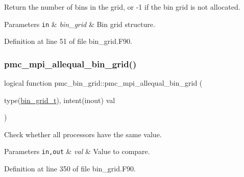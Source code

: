 Return the number of bins in the grid, or -\/1 if the bin grid is not allocated. 


\begin{DoxyParams}[1]{Parameters}
\mbox{\tt in}  & {\em bin\+\_\+grid} & Bin grid structure. \\
\hline
\end{DoxyParams}


Definition at line 51 of file bin\+\_\+grid.\+F90.

\mbox{\label{namespacepmc__bin__grid_a7a3956cc26b9ca8736fb65b47a1f8b67}} 
\subsubsection{\texorpdfstring{pmc\+\_\+mpi\+\_\+allequal\+\_\+bin\+\_\+grid()}{pmc\_mpi\_allequal\_bin\_grid()}}
{\footnotesize\ttfamily logical function pmc\+\_\+bin\+\_\+grid\+::pmc\+\_\+mpi\+\_\+allequal\+\_\+bin\+\_\+grid (\begin{DoxyParamCaption}\item[{type(\mbox{\hyperlink{structpmc__bin__grid_1_1bin__grid__t}{bin\+\_\+grid\+\_\+t}}), intent(inout)}]{val }\end{DoxyParamCaption})}



Check whether all processors have the same value. 


\begin{DoxyParams}[1]{Parameters}
\mbox{\tt in,out}  & {\em val} & Value to compare. \\
\hline
\end{DoxyParams}


Definition at line 350 of file bin\+\_\+grid.\+F90.

\mbox{\label{namespacepmc__bin__grid_a83f71861916da3f47f6baac24cf45010}} 
